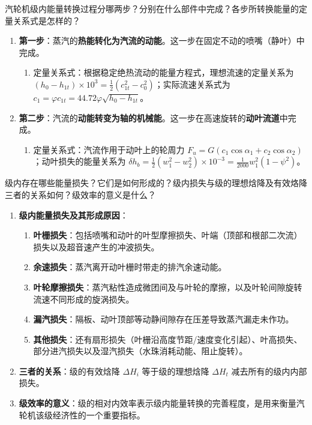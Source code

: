 \begin{problem}
汽轮机级内能量转换过程分哪两步？分别在什么部件中完成？各步所转换能量的定量关系式是怎样的？
\end{problem}

\begin{solution}
\begin{enumerate}
  \item \textbf{第一步}：蒸汽的\textbf{热能转化为汽流的动能}。这一步在固定不动的喷嘴（静叶）中完成。
  \begin{enumerate}
    \item 定量关系式：根据稳定绝热流动的能量方程式，理想流速的定量关系为 \((h_0 - h_{1t}) \times 10^3 = \frac{1}{2}(c_{1t}^2 - c_0^2)\)；实际流速关系式为 \(c_1 = \varphi c_{1t} = 44.72 \varphi \sqrt{h_0 - h_{1t}}\)。
  \end{enumerate}
  \item \textbf{第二步}：汽流的\textbf{动能转变为轴的机械能}。这一步在高速旋转的\textbf{动叶流道}中完成。
  \begin{enumerate}
    \item 定量关系式：汽流作用于动叶上的轮周力 \(F_u = G(c_1 \cos\alpha_1 + c_2 \cos\alpha_2)\)；动叶损失的能量关系为 \(\delta h_b = \frac{1}{2}(w_1^2 - w_2^2) \times 10^{-3} = \frac{1}{2000}w_1^2(1 - \psi^2)\)。
  \end{enumerate}
\end{enumerate}
\end{solution}

\begin{problem}
级内存在哪些能量损失？它们是如何形成的？级内损失与级的理想焓降及有效烙降三者的关系如何？级效率的意义是什么？
\end{problem}

\begin{solution}
\begin{enumerate}
  \item \textbf{级内能量损失及其形成原因}：
  \begin{enumerate}
    \item \textbf{叶栅损失}：包括喷嘴和动叶的叶型摩擦损失、叶端（顶部和根部二次流）损失以及超音速产生的冲波损失。
    \item \textbf{余速损失}：蒸汽离开动叶栅时带走的排汽余速动能。
    \item \textbf{叶轮摩擦损失}：蒸汽粘性造成微团间及与叶轮的摩擦，以及叶轮间隙旋转流速不同形成的旋涡损失。
    \item \textbf{漏汽损失}：隔板、动叶顶部等动静间隙存在压差导致蒸汽漏走未作功。
    \item \textbf{其他损失}：还有扇形损失（叶栅沿高度节距/速度变化引起）、叶高损失、部分进汽损失以及湿汽损失（水珠消耗动能、阻止旋转）。
  \end{enumerate}
  \item \textbf{三者的关系}：级的有效焓降 \(\Delta H_i\) 等于级的理想焓降 \(\Delta H_t\) 减去所有的级内内部损失。
  \item \textbf{级效率的意义}：级的相对内效率表示级内能量转换的完善程度，是用来衡量汽轮机该级经济性的一个重要指标。
\end{enumerate}
\end{solution}


